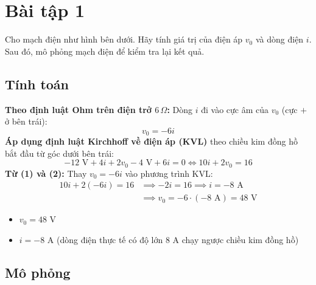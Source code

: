 \section{Bài tập 1}

Cho mạch điện như hình bên dưới. Hãy tính giá trị của điện áp $v_0$ và dòng điện $i$. Sau đó, mô phỏng mạch điện để kiểm tra lại kết quả.


\subsection{Tính toán}
\noindent\textbf{Theo định luật Ohm trên điện trở $6\,\Omega$:} Dòng $i$ đi vào cực âm của $v_0$ (cực $+$ ở bên trái):
\begin{equation}
v_0 = -6i \label{eq:ex1_1}
\end{equation}
\noindent\textbf{Áp dụng định luật Kirchhoff về điện áp (KVL)} theo chiều kim đồng hồ bắt đầu từ góc dưới bên trái:
\begin{equation}
-12\text{ V} + 4i + 2v_0 - 4\text{ V} + 6i = 0 \iff 10i + 2v_0 = 16 \label{eq:ex1_2}
\end{equation}
\noindent\textbf{Từ (1) và (2):} Thay $v_0 = -6i$ vào phương trình KVL:
\begin{align*}
10i + 2(-6i) = 16 &\implies -2i = 16 \implies i = -8\text{ A} \\
&\implies v_0 = -6 \cdot (-8\text{ A}) = 48\text{ V}
\end{align*}

\begin{dapsobox}
  \begin{itemize}[leftmargin=1.5em]
    \item $v_0 = 48\text{ V}$
    \item $i = -8\text{ A}$ \quad (dòng điện thực tế có độ lớn $8\text{ A}$ chạy ngược chiều kim đồng hồ)
  \end{itemize}
\end{dapsobox}

\subsection{Mô phỏng}
\simresult
{}
